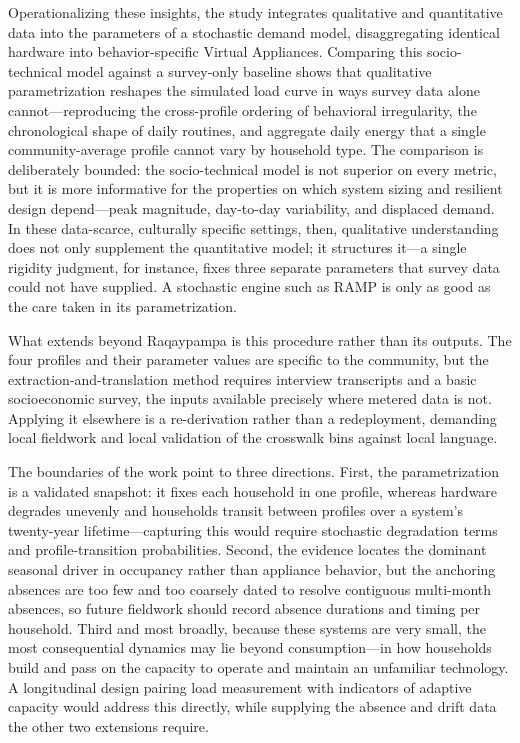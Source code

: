 \documentclass[final,3p,times,onecolumn]{elsarticle}
\begin{document}
Operationalizing these insights, the study integrates qualitative and quantitative data into the parameters of a stochastic demand model, disaggregating identical hardware into behavior-specific Virtual Appliances. Comparing this socio-technical model against a survey-only baseline shows that qualitative parametrization reshapes the simulated load curve in ways survey data alone cannot—reproducing the cross-profile ordering of behavioral irregularity, the chronological shape of daily routines, and aggregate daily energy that a single community-average profile cannot vary by household type. The comparison is deliberately bounded: the socio-technical model is not superior on every metric, but it is more informative for the properties on which system sizing and resilient design depend—peak magnitude, day-to-day variability, and displaced demand. In these data-scarce, culturally specific settings, then, qualitative understanding does not only supplement the quantitative model; it structures it—a single rigidity judgment, for instance, fixes three separate parameters that survey data could not have supplied. A stochastic engine such as RAMP is only as good as the care taken in its parametrization.

What extends beyond Raqaypampa is this procedure rather than its outputs. The four profiles and their parameter values are specific to the community, but the extraction-and-translation method requires interview transcripts and a basic socioeconomic survey, the inputs available precisely where metered data is not. Applying it elsewhere is a re-derivation rather than a redeployment, demanding local fieldwork and local validation of the crosswalk bins against local language.

The boundaries of the work point to three directions. First, the parametrization is a validated snapshot: it fixes each household in one profile, whereas hardware degrades unevenly and households transit between profiles over a system's twenty-year lifetime—capturing this would require stochastic degradation terms and profile-transition probabilities. Second, the evidence locates the dominant seasonal driver in occupancy rather than appliance behavior, but the anchoring absences are too few and too coarsely dated to resolve contiguous multi-month absences, so future fieldwork should record absence durations and timing per household. Third and most broadly, because these systems are very small, the most consequential dynamics may lie beyond consumption—in how households build and pass on the capacity to operate and maintain an unfamiliar technology. A longitudinal design pairing load measurement with indicators of adaptive capacity would address this directly, while supplying the absence and drift data the other two extensions require.
\end{document}
